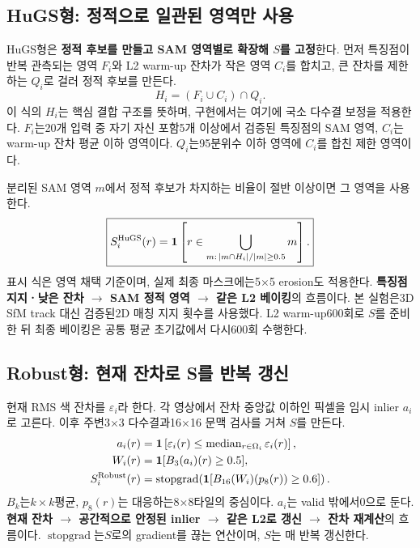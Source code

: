 \documentclass[11pt,a4paper]{article}
\newcommand{\ind}{\mathbf{1}}
\newcommand{\sg}{\operatorname{stopgrad}}
\newcommand{\med}{\operatorname{median}}
\begin{document}
\subsection{HuGS형: 정적으로 일관된 영역만 사용}
HuGS형은 \textbf{정적 후보를 만들고 SAM 영역별로 확장해 $S$를 고정}한다. 먼저 특징점이 반복 관측되는 영역 $F_i$와 L2 warm-up 잔차가 작은 영역 $C_i$를 합치고, 큰 잔차를 제한하는 $Q_i$로 걸러 정적 후보를 만든다.
\begin{equation}
 H_i=(F_i\cup C_i)\cap Q_i.
\end{equation}
이 식의 $H_i$는 핵심 결합 구조를 뜻하며, 구현에서는 여기에 국소 다수결 보정을 적용한다. $F_i$는20개 입력 중 자기 자신 포함5개 이상에서 검증된 특징점의 SAM 영역, $C_i$는 warm-up 잔차 평균 이하 영역이다. $Q_i$는95분위수 이하 영역에 $C_i$를 합친 제한 영역이다.

분리된 SAM 영역 $m$에서 정적 후보가 차지하는 비율이 절반 이상이면 그 영역을 사용한다.
\begin{equation}
 \boxed{S_i^{\rm HuGS}(r)=
 \ind\left[r\in\bigcup_{m:\,|m\cap H_i|/|m|\ge0.5}m\right].}
\end{equation}
표시 식은 영역 채택 기준이며, 실제 최종 마스크에는5$\times$5 erosion도 적용한다. \textbf{특징점 지지ㆍ낮은 잔차 $\rightarrow$ SAM 정적 영역 $\rightarrow$ 같은 L2 베이킹}의 흐름이다. 본 실험은3D SfM track 대신 검증된2D 매칭 지지 횟수를 사용했다. L2 warm-up600회로 $S$를 준비한 뒤 최종 베이킹은 공통 평균 초기값에서 다시600회 수행한다.

\subsection{Robust형: 현재 잔차로 S를 반복 갱신}
현재 RMS 색 잔차를 $\varepsilon_i$라 한다. 각 영상에서 잔차 중앙값 이하인 픽셀을 임시 inlier $a_i$로 고른다. 이후 주변3$\times$3 다수결과16$\times$16 문맥 검사를 거쳐 $S$를 만든다.
\begin{align}
 a_i(r)&=\ind\left[\varepsilon_i(r)\le\med_{r\in\Omega_i}\varepsilon_i(r)\right],\\
 W_i(r)&=\ind[B_3(a_i)(r)\ge0.5],\\
 S_i^{\rm Robust}(r)&=\sg\!\left(\ind[B_{16}(W_i)(p_8(r))\ge0.6]\right).
\end{align}
$B_k$는$k\times k$평균, $p_8(r)$는 대응하는8$\times$8타일의 중심이다. $a_i$는 valid 밖에서0으로 둔다. \textbf{현재 잔차 $\rightarrow$ 공간적으로 안정된 inlier $\rightarrow$ 같은 L2로 갱신 $\rightarrow$ 잔차 재계산}의 흐름이다. $\sg$는$S$로의 gradient를 끊는 연산이며, $S$는 매 반복 갱신한다.
\end{document}
